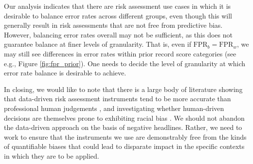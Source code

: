 \documentclass[11pt, svgnames, twocolumn]{article}
\newcommand{\fpr}{\mathrm{FPR}}
\numberwithin{equation}{section}
\theoremstyle{plain}
\theoremstyle{definition}
\numberwithin{theorem}{section}
\numberwithin{prop}{section}
\numberwithin{corollary}{section}
\numberwithin{definition}{section}
\begin{document}
Our analysis indicates that there are risk assessment use cases in which it is desirable to balance error rates across different groups, even though this will generally result in risk assessments that are not free from predictive bias.  However, balancing error rates overall may not be sufficient, as this does not guarantee balance at finer levels of granularity.  That is, even if $\fpr_b = \fpr_w$, we may still see differences in error rates within prior record score categories (see e.g., Figure \ref{fig:fpr_prior}).  One needs to decide the level of granularity at which error rate balance is desirable to achieve.  

In closing, we would like to note that there is a large body of literature showing that data-driven risk assessment instruments tend to be more accurate than professional human judgements \cite{meehl1954clinical, grove2000clinical}, and investigating whether human-driven decisions are themselves prone to exhibiting racial bias \cite{anwar2012testing, sweeney1992influence}.  We should not abandon the data-driven approach on the basis of negative headlines.  Rather, we need to work to ensure that the instruments we use are demonstrably free from the kinds of quantifiable biases that could lead to disparate impact in the specific contexts in which they are to be applied.
   
 

  
\newpage 
% 
% 


\end{document}
